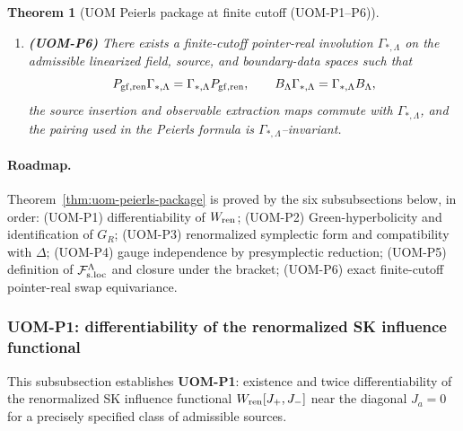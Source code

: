 \documentclass[10pt]{article}
\theoremstyle{definition}
\theoremstyle{plain}
\newtheorem{theorem}{Theorem}[section]
\begin{document}
\begin{theorem}[UOM Peierls package at finite cutoff (UOM-P1--P6)]
\begin{enumerate}[label=\textnormal{(\roman*)},leftmargin=2.2em,itemsep=2pt]
antisymmetry, Leibniz, and Jacobi there.  Moreover, $\mathcal F_{\rm s.loc}^\Lambda$ contains the quasi-local
observables used to represent RG monotones (e.g.\ the Wess--Zumino/anomaly densities smeared by compact kernels).
\item \textbf{(UOM-P6)} There exists a finite-cutoff pointer-real involution $\Gamma_{*,\Lambda}$ on the admissible
linearized field, source, and boundary-data spaces such that
\[
P_{\rm gf,ren}\Gamma_{*,\Lambda}=\Gamma_{*,\Lambda}P_{\rm gf,ren},
\qquad
B_\Lambda\Gamma_{*,\Lambda}=\Gamma_{*,\Lambda}B_\Lambda,
\]
the source insertion and observable extraction maps commute with $\Gamma_{*,\Lambda}$, and the pairing used in the
Peierls formula is $\Gamma_{*,\Lambda}$--invariant.
\end{enumerate}
\end{theorem}

\paragraph{Roadmap.}
Theorem~\ref{thm:uom-peierls-package} is proved by the six subsubsections below, in order:
(UOM-P1) differentiability of $W_{\rm ren}$; (UOM-P2) Green-hyperbolicity and identification of $G_R$; (UOM-P3) renormalized
symplectic form and compatibility with $\Delta$; (UOM-P4) gauge independence by presymplectic reduction; (UOM-P5) definition of
$\mathcal F_{\rm s.loc}^\Lambda$ and closure under the bracket; (UOM-P6) exact finite-cutoff pointer-real swap equivariance.


\subsubsection{UOM-P1: differentiability of the renormalized SK influence functional}
\label{subsubsec:uom-P1}

This subsubsection establishes \textbf{UOM-P1}: existence and twice differentiability of the
renormalized SK influence functional $W_{\rm ren}[J_+,J_-]$ near the diagonal $J_a=0$
for a precisely specified class of admissible sources.
\end{document}
